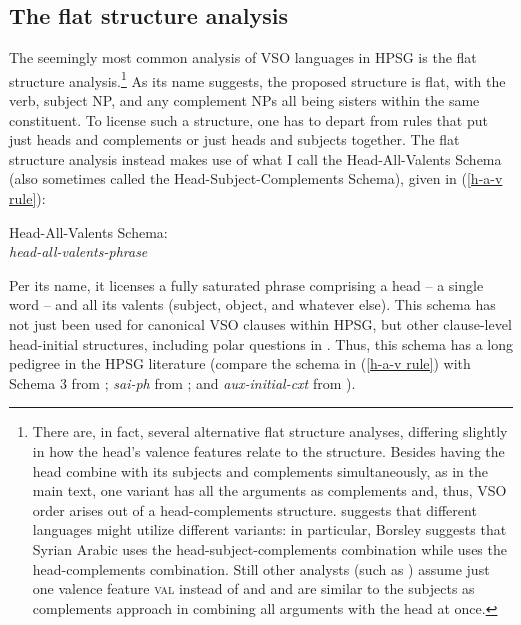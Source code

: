 \documentclass[output=paper
 	        ,biblatex
                ,babelshorthands
                ,newtxmath
                ,draftmode
                ,colorlinks, citecolor=brown
]{langscibook}
\begin{document}
\subsection{The flat structure analysis}
\label{understudied-sec-flat}

The seemingly most common analysis of VSO languages in HPSG is the flat structure
analysis.\footnote{There are, in fact, several alternative flat structure analyses, differing
  slightly in how the head's valence features relate to the structure. Besides having the head
  combine with its subjects and complements simultaneously, as in the main text, one variant has all
  the arguments as complements and, thus, VSO order arises out of a head-complements
  structure. \citet{borsley95} suggests that different languages might utilize different variants:
  in particular, Borsley suggests that Syrian Arabic uses the
  head-subject-complements combination while  uses the head-complements
  combination. Still other analysts (such as \citealt{ball08thesis,ball17}) assume just one valence
  feature \textsc{val} instead of \subj and \comps and are similar to the subjects as complements
  approach in combining all arguments with the head at once.} As its name suggests, the proposed structure is flat, with the verb, subject NP, and any complement NPs all being sisters within the same constituent. To license such a structure, one has to depart from rules that put just heads and complements or just heads and subjects together. The flat structure analysis instead makes use of what I call the Head-All-Valents Schema (also sometimes called the Head-Subject-Complements Schema), given in (\ref{h-a-v rule}):   
%
\begin{samepage}
\begin{exe}
\ex \label{h-a-v rule}
Head-All-Valents Schema:\\
\emph{head-all-valents-phrase} \impl  \\
\end{exe}
\end{samepage}
%
Per its name, it licenses a fully saturated phrase comprising a head -- a single word -- and all its valents (subject, object, and whatever else). This schema has not just been used for canonical VSO clauses within HPSG, but other clause-level head-initial structures, including polar questions in . Thus, this schema has a long pedigree in the HPSG literature (compare the schema in (\ref{h-a-v rule}) with Schema 3 from \citealt[40]{ps2}; \textit{sai-ph} from \citealt[36]{GSag2000a-u}; and \textit{aux-initial-cxt} from \citealt[188]{Sag2012a}).
 
\end{document}
